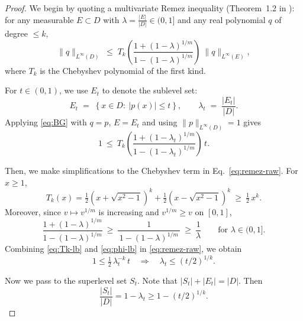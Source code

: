 \documentclass{article}
\theoremstyle{plain}
\newenvironment{REV*}
  {\begingroup\color[HTML]{000000}}
  {\endgroup}
\begin{document}
\begin{REV*}
\begin{proof}
We begin by quoting a multivariate Remez inequality (Theorem~1.2 in \cite{BRUDNYI_2015}): for any measurable $E\subset D$ with 
$\lambda=\frac{|E|}{|D|}\in(0,1]$ and any real polynomial $q$ of degree $\le k$,
\begin{equation}\label{eq:BG}
\|q\|_{L^\infty\!\left(D\right)}
\;\le\;
T_k\!\left(\frac{1+\left(1-\lambda\right)^{1/m}}{1-\left(1-\lambda\right)^{1/m}}\right)
\ \|q\|_{L^\infty\!\left(E\right)},
\end{equation}
where $T_k$ is the Chebyshev polynomial of the first kind.

For $t\in(0,1)$, we use $E_t$ to denote the sublevel set:
\begin{equation}
    E_t\;=\;\left\{x\in D:\ |p(x)|\le t\right\},\qquad 
\lambda_t\;=\;\frac{|E_t|}{|D|}.
\end{equation}
Applying \eqref{eq:BG} with $q=p$, $E=E_t$ and using $\|p\|_{L^\infty(D)}=1$ gives
\begin{equation}\label{eq:remez-raw}
1\ \le\
T_k\!\left(\frac{1+\left(1-\lambda_t\right)^{1/m}}{1-\left(1-\lambda_t\right)^{1/m}}\right)\, t.
\end{equation}

Then, we make simplifications to the Chebyshev term in Eq.~\eqref{eq:remez-raw}. For $x\ge 1$,
\begin{equation}\label{eq:Tk-lb}
T_k(x)
=\tfrac12\!\left(x+\sqrt{x^2-1}\right)^{\!k}
+\tfrac12\!\left(x-\sqrt{x^2-1}\right)^{\!k}
\ \ge\ \tfrac12\,x^{k}.
\end{equation}
Moreover, since $v\mapsto v^{1/m}$ is increasing and $v^{1/m}\ge v$ on $\left[0,1\right]$,
\begin{equation}\label{eq:phi-lb}
\frac{1+\left(1-\lambda\right)^{1/m}}{1-\left(1-\lambda\right)^{1/m}}
\ \ge\ \frac{1}{\,1-\left(1-\lambda\right)^{1/m}\,}
\ \ge\ \frac{1}{\lambda}\qquad\text{for }\lambda\in(0,1].
\end{equation}
Combining \eqref{eq:Tk-lb} and \eqref{eq:phi-lb} in \eqref{eq:remez-raw}, we obtain
\begin{equation}
    1 \leq \tfrac12\,\lambda_t^{-k}\, t
\quad\Longrightarrow\quad
\lambda_t \leq (t/2)^{1/k}.
\end{equation}

Now we pass to the superlevel set $S_t$. Note that $|S_t|+|E_t| = |D|$. Then
\begin{equation}\label{eq:measure-superlevel}
\frac{|S_t|}{|D|}
= 1-\lambda_t
\geq 1- (t/2)^{1/k}.
\end{equation}


\end{proof}
\end{REV*}
\end{document}
